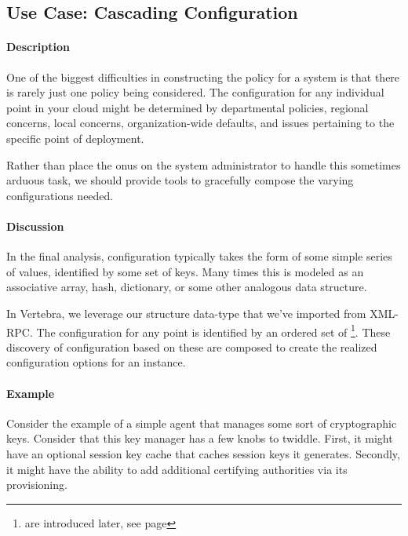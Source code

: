 \subsection{Use Case: Cascading Configuration}

\paragraph{Description}

One of the biggest difficulties in constructing the policy for a system is that there is rarely just one policy being considered.  The configuration for any individual point in your cloud might be determined by departmental policies, regional concerns, local concerns, organization-wide defaults, and issues pertaining to the specific point of deployment.

Rather than place the onus on the system administrator to handle this sometimes arduous task, we should provide tools to gracefully compose the varying configurations needed.

\paragraph{Discussion}

In the final analysis, configuration typically takes the form of some simple series of values, identified by some set of keys.  Many times this is modeled as an associative array, hash, dictionary, or some other analogous data structure.

In Vertebra, we leverage our structure data-type that we've imported from XML-RPC.  The configuration for any point is identified by an ordered set of \resources{}\footnote{\resources{} are introduced later, see page \pageref{ref:define-resource}}.  These discovery of configuration based on these \resources{} are composed to create the realized configuration options for an instance.

\paragraph{Example}

Consider the example of a simple agent that manages some sort of cryptographic keys.  Consider that this key manager has a few knobs to twiddle.  First, it might have an optional session key cache that caches session keys it generates.  Secondly, it might have the ability to add additional certifying authorities via its provisioning.

